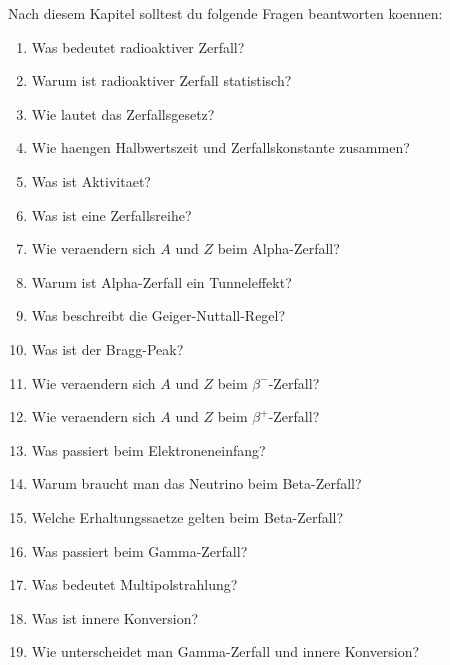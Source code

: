 \begin{examtipbox}
Nach diesem Kapitel solltest du folgende Fragen beantworten koennen:
\begin{enumerate}
    \item Was bedeutet radioaktiver Zerfall?
    \item Warum ist radioaktiver Zerfall statistisch?
    \item Wie lautet das Zerfallsgesetz?
    \item Wie haengen Halbwertszeit und Zerfallskonstante zusammen?
    \item Was ist Aktivitaet?
    \item Was ist eine Zerfallsreihe?
    \item Wie veraendern sich $A$ und $Z$ beim Alpha-Zerfall?
    \item Warum ist Alpha-Zerfall ein Tunneleffekt?
    \item Was beschreibt die Geiger-Nuttall-Regel?
    \item Was ist der Bragg-Peak?
    \item Wie veraendern sich $A$ und $Z$ beim $\beta^-$-Zerfall?
    \item Wie veraendern sich $A$ und $Z$ beim $\beta^+$-Zerfall?
    \item Was passiert beim Elektroneneinfang?
    \item Warum braucht man das Neutrino beim Beta-Zerfall?
    \item Welche Erhaltungssaetze gelten beim Beta-Zerfall?
    \item Was passiert beim Gamma-Zerfall?
    \item Was bedeutet Multipolstrahlung?
    \item Was ist innere Konversion?
    \item Wie unterscheidet man Gamma-Zerfall und innere Konversion?
\end{enumerate}
\end{examtipbox}
